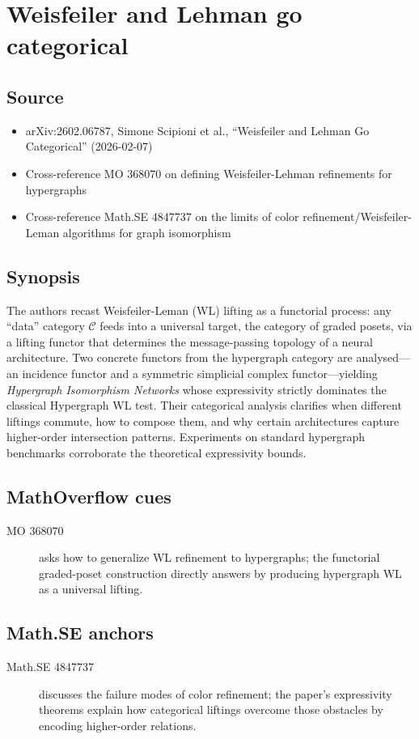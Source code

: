 \section*{Weisfeiler and Lehman go categorical}
\subsection*{Source}
\begin{itemize}
  \item arXiv:2602.06787, Simone Scipioni et al., ``Weisfeiler and Lehman Go Categorical'' (2026-02-07)
  \item Cross-reference MO 368070 on defining Weisfeiler-Lehman refinements for hypergraphs
  \item Cross-reference Math.SE 4847737 on the limits of color refinement/Weisfeiler-Leman algorithms for graph isomorphism
\end{itemize}
\subsection*{Synopsis}
The authors recast Weisfeiler-Leman (WL) lifting as a functorial process: any ``data'' category $\mathcal{C}$ feeds into a universal target, the category of graded posets, via a lifting functor that determines the message-passing topology of a neural architecture. Two concrete functors from the hypergraph category are analysed---an incidence functor and a symmetric simplicial complex functor---yielding \emph{Hypergraph Isomorphism Networks} whose expressivity strictly dominates the classical Hypergraph WL test. Their categorical analysis clarifies when different liftings commute, how to compose them, and why certain architectures capture higher-order intersection patterns. Experiments on standard hypergraph benchmarks corroborate the theoretical expressivity bounds.
\subsection*{MathOverflow cues}
\begin{description}
  \item[MO 368070] asks how to generalize WL refinement to hypergraphs; the functorial graded-poset construction directly answers by producing hypergraph WL as a universal lifting.
\end{description}
\subsection*{Math.SE anchors}
\begin{description}
  \item[Math.SE 4847737] discusses the failure modes of color refinement; the paper’s expressivity theorems explain how categorical liftings overcome those obstacles by encoding higher-order relations.
\end{description}
